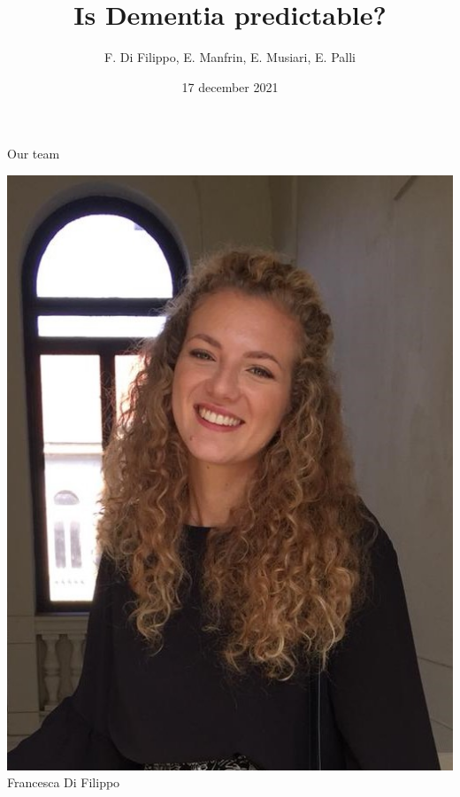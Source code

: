 \documentclass{beamer}
\title{{\LARGE Is Dementia predictable?}}
\author{F. Di Filippo, E. Manfrin, E. Musiari, E. Palli}
\date{17 december 2021}
\begin{document}
	
	\begin{frame}
		\maketitle
	\end{frame}



\begin{frame}{Our team}
\begin{minipage}{0.24\textwidth}
	\vspace{0.55cm}
	\begin{center}%
		\includegraphics[width=\columnwidth]{francescataglio.jpeg}
		Francesca Di Filippo
	\end{center}
\end{minipage}
\hfill
\begin{minipage}{0.24\textwidth}
	\begin{center}%

\end{center}
\end{minipage}
\end{frame}
\end{document}
